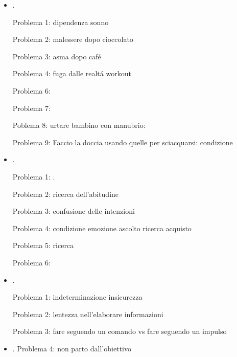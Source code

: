 \begin{itemize}
Problema 2: L'esterno determina i miei impulsi e i miei impulsi sono i miei pensieri

Problema 3: Ho sonno quando faccio una cosa che ho scelto

Problema 4: Tosse/costrizione bronchiale: workout erba-gelato mandorla/pistacchio-birra moretti-fugaza con pasta sfoglia araba??

\item {}.

Problema 1: dipendenza sonno

Problema 2: malessere dopo cioccolato

Problema 3: asma dopo caf\'e

Problema 4: fuga dalle realt\'a workout

Problema 6: 

Problema 7: 

Poblema 8: urtare bambino con manubrio: 

Problema 9: Faccio la doccia usando quelle per sciacquarsi: condizione 

\item {}.

Problema 1: .

Problema 2: ricerca dell'abitudine

Problema 3: confusione delle intenzioni

Problema 4: condizione emozione ascolto ricerca acquisto

Problema 5: ricerca 

Problema 6: 


\item {}.

Problema 1: indeterminazione insicurezza

Problema 2: lentezza nell'elaborare informazioni

Problema 3: fare seguendo un comando vs fare seguendo un impulso

\item {}.
Problema 4: non parto dall'obiettivo


\end{itemize}
